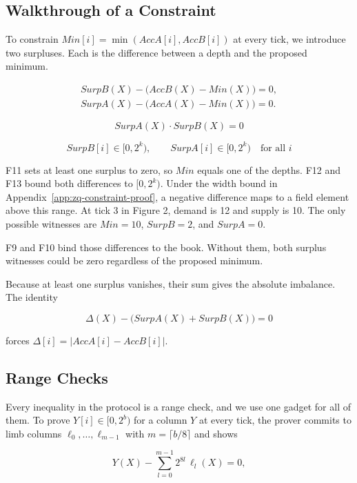 \subsection{Walkthrough of a Constraint}

To constrain \(Min[i]=\min(AccA[i],AccB[i])\) at every tick, we introduce two surpluses. Each is the difference between a depth and the proposed minimum.

\begin{equation}
\begin{gathered}
SurpB(X) - \bigl(AccB(X) - Min(X)\bigr) = 0, \\
SurpA(X) - \bigl(AccA(X) - Min(X)\bigr) = 0.
\end{gathered}
\tag{F9, F10}
\end{equation}

\[SurpA(X) \cdot SurpB(X) = 0 \tag{F11}\]

\[SurpB[i] \in [0, 2^k), \qquad SurpA[i] \in [0, 2^k) \quad \text{for all } i \tag{F12, F13}\]

F11 sets at least one surplus to zero, so \(Min\) equals one of the depths. F12 and F13 bound both differences to \([0,2^k)\). Under the width bound in Appendix~\ref{app:zq-constraint-proof}, a negative difference maps to a field element above this range. At tick 3 in Figure 2, demand is 12 and supply is 10. The only possible witnesses are \(Min=10\), \(SurpB=2\), and \(SurpA=0\).

F9 and F10 bind those differences to the book. Without them, both surplus witnesses could be zero regardless of the proposed minimum.

Because at least one surplus vanishes, their sum gives the absolute imbalance. The identity

\[\Delta(X) - \big(SurpA(X) + SurpB(X)\big) = 0 \tag{F18}\]

forces \(\Delta[i] = \lvert AccA[i] - AccB[i] \rvert\).

\subsection{Range Checks}

Every inequality in the protocol is a range check, and we use one gadget for all of them. To prove \(Y[i] \in [0, 2^b)\) for a column \(Y\) at every tick, the prover commits to limb columns \(\ell_0, \ldots, \ell_{m-1}\) with \(m = \lceil b/8 \rceil\) and shows

\[Y(X) - \sum_{l=0}^{m-1} 2^{8l}\, \ell_l(X) = 0,\]

